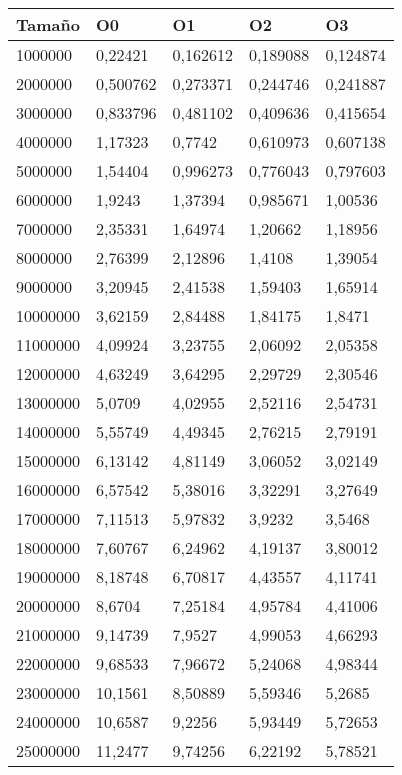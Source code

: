 \begin{tabular}{|l|l|l|l|l|}
	\hline
	Tamaño & O0 & O1 & O2 & O3 \\
	\hline
	\hline
	1000000 & 0,22421 & 0,162612 & 0,189088 & 0,124874 \\
	\hline
	2000000 & 0,500762 & 0,273371 & 0,244746 & 0,241887 \\
	\hline
	3000000 & 0,833796 & 0,481102 & 0,409636 & 0,415654 \\
	\hline
	4000000 & 1,17323 & 0,7742 & 0,610973 & 0,607138 \\
	\hline
	5000000 & 1,54404 & 0,996273 & 0,776043 & 0,797603 \\
	\hline
	6000000 & 1,9243 & 1,37394 & 0,985671 & 1,00536 \\
	\hline
	7000000 & 2,35331 & 1,64974 & 1,20662 & 1,18956 \\
	\hline
	8000000 & 2,76399 & 2,12896 & 1,4108 & 1,39054 \\
	\hline
	9000000 & 3,20945 & 2,41538 & 1,59403 & 1,65914 \\
	\hline
	10000000 & 3,62159 & 2,84488 & 1,84175 & 1,8471 \\
	\hline
	11000000 & 4,09924 & 3,23755 & 2,06092 & 2,05358 \\
	\hline
	12000000 & 4,63249 & 3,64295 & 2,29729 & 2,30546 \\
	\hline
	13000000 & 5,0709 & 4,02955 & 2,52116 & 2,54731 \\
	\hline
	14000000 & 5,55749 & 4,49345 & 2,76215 & 2,79191 \\
	\hline
	15000000 & 6,13142 & 4,81149 & 3,06052 & 3,02149 \\
	\hline
	16000000 & 6,57542 & 5,38016 & 3,32291 & 3,27649 \\
	\hline
	17000000 & 7,11513 & 5,97832 & 3,9232 & 3,5468 \\
	\hline
	18000000 & 7,60767 & 6,24962 & 4,19137 & 3,80012 \\
	\hline
	19000000 & 8,18748 & 6,70817 & 4,43557 & 4,11741 \\
	\hline
	20000000 & 8,6704 & 7,25184 & 4,95784 & 4,41006 \\
	\hline
	21000000 & 9,14739 & 7,9527 & 4,99053 & 4,66293 \\
	\hline
	22000000 & 9,68533 & 7,96672 & 5,24068 & 4,98344 \\
	\hline
	23000000 & 10,1561 & 8,50889 & 5,59346 & 5,2685 \\
	\hline
	24000000 & 10,6587 & 9,2256 & 5,93449 & 5,72653 \\
	\hline
	25000000 & 11,2477 & 9,74256 & 6,22192 & 5,78521 \\
	\hline
\end{tabular}
